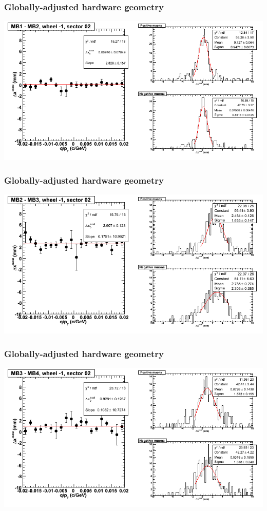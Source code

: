 \documentclass[compress]{beamer}
\begin{document}
\begin{frame}
\frametitle{Globally-adjusted hardware geometry}
\includegraphics[width=\linewidth]{NOV4_segdiffs_HW/dt13_resid_B_02_12.png}
\end{frame}

\begin{frame}
\frametitle{Globally-adjusted hardware geometry}
\includegraphics[width=\linewidth]{NOV4_segdiffs_HW/dt13_resid_B_02_23.png}
\end{frame}

\begin{frame}
\frametitle{Globally-adjusted hardware geometry}
\includegraphics[width=\linewidth]{NOV4_segdiffs_HW/dt13_resid_B_02_34.png}
\end{frame}
\end{document}
